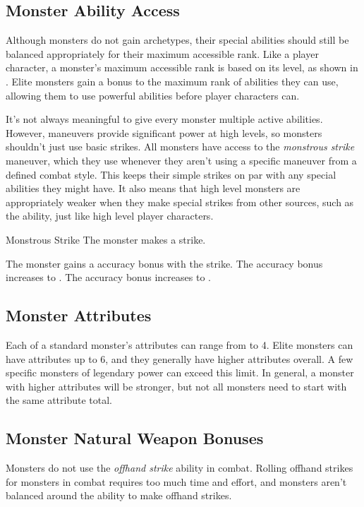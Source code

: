         \subsection{Monster Ability Access}\label{Monster Ability Access}
            Although monsters do not gain archetypes, their special abilities should still be balanced appropriately for their maximum accessible rank.
            Like a player character, a monster's maximum accessible rank is based on its level, as shown in .
            Elite monsters gain a  bonus to the maximum rank of abilities they can use, allowing them to use powerful abilities before player characters can.

            It's not always meaningful to give every monster multiple active abilities.
            However, maneuvers provide significant power at high levels, so monsters shouldn't just use basic strikes.
            All monsters have access to the \textit{monstrous strike} maneuver, which they use whenever they aren't using a specific maneuver from a defined combat style.
            This keeps their simple strikes on par with any special abilities they might have.
            It also means that high level monsters are appropriately weaker when they make special strikes from other sources, such as the  ability, just like high level player characters.
            \begin{freeability}{Monstrous Strike}
                The monster makes a strike.

                \rankline
                 The monster gains a  accuracy bonus with the strike.
                 The accuracy bonus increases to .
                 The accuracy bonus increases to .
            \end{freeability}

    \subsection{Monster Attributes}\label{Monster Attributes}
        Each of a standard monster's attributes can range from  to 4.
        Elite monsters can have attributes up to 6, and they generally have higher attributes overall.
        A few specific monsters of legendary power can exceed this limit.
        In general, a monster with higher attributes will be stronger, but not all monsters need to start with the same attribute total.

    \subsection{Monster Natural Weapon Bonuses}\label{Monster Natural Weapon Bonuses}
        Monsters do not use the \textit{offhand strike} ability in combat.
        Rolling offhand strikes for monsters in combat requires too much time and effort, and monsters aren't balanced around the ability to make offhand strikes.

